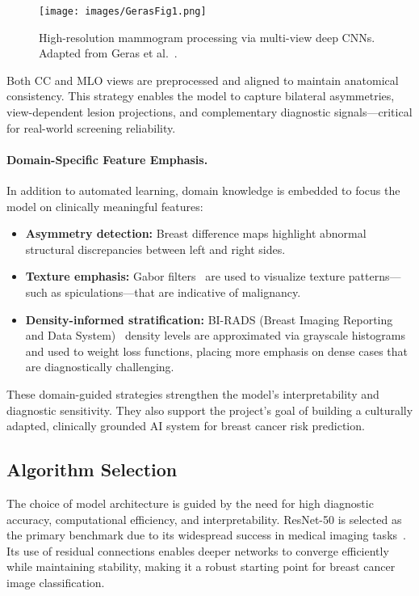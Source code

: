 \documentclass[12pt]{article}
\begin{document}
\begin{figure}[H]
    \centering
    \texttt{[image: images/GerasFig1.png]}
    \caption{High-resolution mammogram processing via multi-view deep CNNs. Adapted from Geras et al.~\cite{8}.}
    \label{fig:geras}
\end{figure}

Both CC and MLO views are preprocessed and aligned to maintain anatomical consistency. This strategy enables the model to capture bilateral asymmetries, view-dependent lesion projections, and complementary diagnostic signals—critical for real-world screening reliability.

\paragraph{Domain-Specific Feature Emphasis.}
In addition to automated learning, domain knowledge is embedded to focus the model on clinically meaningful features:

\begin{itemize}
    \item \textbf{Asymmetry detection:} Breast difference maps highlight abnormal structural discrepancies between left and right sides.
    \item \textbf{Texture emphasis:} Gabor filters~\cite{20} are used to visualize texture patterns—such as spiculations—that are indicative of malignancy.
    \item \textbf{Density-informed stratification:} BI-RADS (Breast Imaging Reporting and Data System)~\cite{16} density levels are approximated via grayscale histograms and used to weight loss functions, placing more emphasis on dense cases that are diagnostically challenging.
\end{itemize}

These domain-guided strategies strengthen the model’s interpretability and diagnostic sensitivity. They also support the project’s goal of building a culturally adapted, clinically grounded AI system for breast cancer risk prediction.

\subsection{Algorithm Selection}

The choice of model architecture is guided by the need for high diagnostic accuracy, computational efficiency, and interpretability. ResNet-50 is selected as the primary benchmark due to its widespread success in medical imaging tasks~\cite{1,7}. Its use of residual connections enables deeper networks to converge efficiently while maintaining stability, making it a robust starting point for breast cancer image classification.
\end{document}
